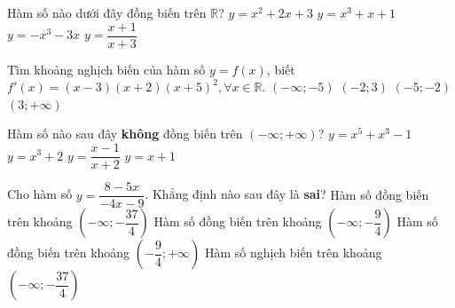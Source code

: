 \begin{ex}%
	Hàm số nào dưới đây đồng biến trên $\mathbb{R}$? 
	 \choice
		 {$y=x^2+2x+3$}
		 {\True $y=x^3+x+1$}
		{$y=-x^3-3x$} 
		 {$y=\dfrac{x+1}{x+3}$}
\end{ex}

\begin{ex}%
	Tìm khoảng nghịch biến của hàm số  $y=f(x)$, biết $f'(x)=(x-3)(x+2)(x+5)^2,\forall x\in \mathbb{R}$.
	 \choice
		 {$(-\infty;-5)$}
		{\True  $(-2;3)$}
		 {$(-5;-2)$}
		{$(3;+\infty)$} 
\end{ex}

\begin{ex}%
	Hàm số nào  sau đây \textbf{không} đồng biến trên $(-\infty;+\infty)$?
	 \choice
		{$y=x^5+x^3-1$} 
		 {$y=x^3+2$}
		 {\True $y=\dfrac{x-1}{x+2}$}
		 {$y=x+1$}
\end{ex}

\begin{ex}%
	Cho hàm số $y=\dfrac{8-5x}{-4x-9}$. Khẳng định  nào sau đây là \textbf{sai}?
	 \choice
		{Hàm số  đồng biến trên khoảng $\left(-\infty;-\dfrac{37}{4}\right)$}
		{Hàm số đồng biến trên khoảng $\left(-\infty;-\dfrac{9}{4}\right)$} 
		{Hàm  số đồng biến trên khoảng $\left(-\dfrac{9}{4};+\infty\right)$}
		 {\True Hàm số nghịch biến trên khoảng $\left(-\infty;-\dfrac{37}{4}\right)$}
\end{ex}

